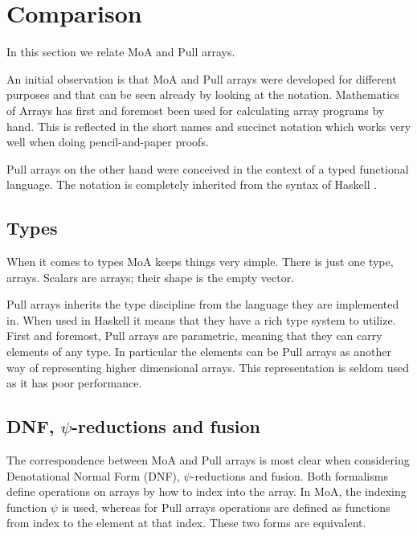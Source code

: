 \documentclass[preprint]{sigplanconf}
\begin{document}
\section{Comparison}

In this section we relate MoA and Pull arrays. 

An initial observation is that MoA and Pull arrays were developed for
different purposes and that can be seen already by looking at the
notation. Mathematics of Arrays has first and foremost been used for
calculating array programs by hand. This is reflected in the short
names and succinct notation which works very well when doing
pencil-and-paper proofs.

Pull arrays on the other hand were conceived in the context of a
typed functional language. The notation is completely inherited from
the syntax of Haskell \cite{marlow2010haskell}.

\subsection{Types}
\label{sec:types}

When it comes to types MoA keeps things very simple. There is just one
type, arrays.  Scalars are arrays;  their shape is the empty vector. 


Pull arrays inherits the type discipline from the language they are
implemented in. When used in Haskell it means that they have a rich
type system to utilize. First and foremost, Pull arrays are
parametric, meaning that they can carry elements of any type. In
particular the elements can be Pull arrays as another way of
representing higher dimensional arrays. This representation is seldom
used as it has poor performance.

\subsection{DNF, \(\psi\)-reductions and fusion}
\label{sec:normalization}

The correspondence between MoA and Pull arrays is most clear when
considering Denotational Normal Form (DNF), \(\psi\)-reductions and
fusion. Both formalisms define operations on arrays by how to index
into the array. In MoA, the indexing function \(\psi\) is used,
whereas for Pull arrays operations are defined as functions from index
to the element at that index. These two forms are equivalent.
\end{document}
